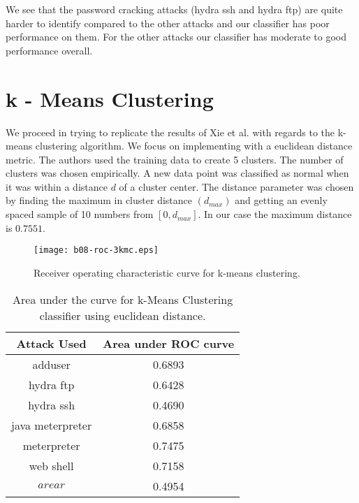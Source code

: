 \documentclass[reqno,openany,12pt]{amsbook}
\begin{document}
We see that the password cracking attacks (hydra ssh and hydra ftp) are quite harder to identify compared to the other attacks and our classifier has poor performance on them. For the other attacks our classifier has moderate to good performance overall.



\section{k - Means Clustering}


We proceed in trying to replicate the results of Xie et al.\cite{adf1} with regards to the k-means clustering algorithm. We focus on implementing with a euclidean distance metric. The authors used the training data to create 5 clusters. The number of clusters was chosen empirically. A new data point was classified as normal when it was within a distance $d$ of a cluster center. The distance parameter was chosen by finding the maximum in cluster distance $(d_{max})$ and getting an evenly spaced sample of 10 numbers from $[0,d_{max}]$. In our case the maximum distance is $0.7551$.

\begin{figure}
\texttt{[image: b08-roc-3kmc.eps]}
\caption{Receiver operating characteristic curve for k-means clustering.}
\label{kmcroc1}
\end{figure}

\begin{table}
\begin{tabular}{|c|c|}
\hline
Attack Used &  Area under ROC curve \\ \hline 
adduser          & 0.6893 \\ \hline
hydra ftp        & 0.6428 \\ \hline
hydra ssh        & 0.4690 \\ \hline
java meterpreter & 0.6858 \\ \hline
meterpreter      & 0.7475 \\ \hline
web shell        & 0.7158 \\ \hline
$arear$          & 0.4954 \\ \hline
\end{tabular}
\vspace{5pt}
\caption{Area under the curve for k-Means Clustering classifier using euclidean distance.}
\label{kmct1}
\end{table}
\end{document}
